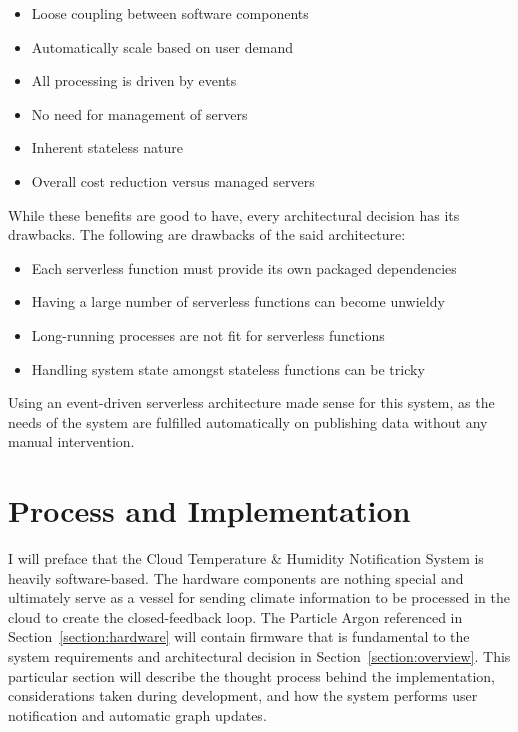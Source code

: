 \documentclass{article}
\begin{document}
\begin{itemize}
    \item Loose coupling between software components
    \item Automatically scale based on user demand
    \item All processing is driven by events
    \item No need for management of servers
    \item Inherent stateless nature
    \item Overall cost reduction versus managed servers
\end{itemize}

While these benefits are good to have, every architectural decision has its drawbacks. The following  are drawbacks of the said architecture:

\begin{itemize}
    \item Each serverless function must provide its own packaged dependencies
    \item Having a large number of serverless functions can become unwieldy
    \item Long-running processes are not fit for serverless functions
    \item Handling system state amongst stateless functions can be tricky
\end{itemize}

Using an event-driven serverless architecture made sense for this system, as the needs of the system are fulfilled automatically on publishing data without any manual intervention.

\section{Process and Implementation}
I will preface that the Cloud Temperature \& Humidity Notification System is heavily software-based. The hardware components are nothing special and ultimately serve as a vessel for sending climate information to be processed in the cloud to create the closed-feedback loop. The Particle Argon referenced in Section~\ref{section:hardware} will contain firmware that is fundamental to the system requirements and architectural decision in Section~\ref{section:overview}. This particular section will describe the thought process behind the implementation, considerations taken during development, and how the system performs user notification and automatic graph updates.
\end{document}
